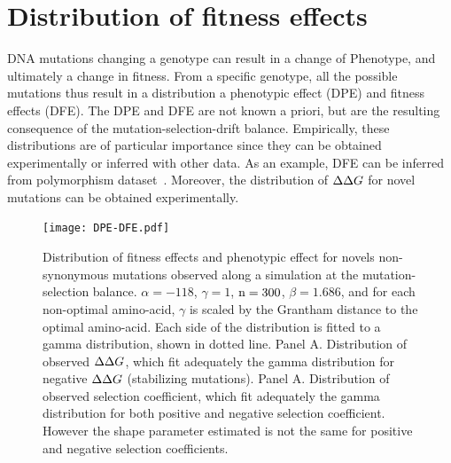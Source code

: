 \section{Distribution of fitness effects}
DNA mutations changing a genotype can result in a change of \gls{Phenotype}, and ultimately a change in fitness.
From a specific genotype, all the possible mutations thus result in a distribution a phenotypic effect (DPE) and fitness effects (\acrshort{DFE}).
The DPE and \acrshort{DFE} are not known a priori, but are the resulting consequence of the mutation-selection-drift balance.
Empirically, these distributions are of particular importance since they can be obtained experimentally or inferred with other data.
As an example, \acrshort{DFE} can be inferred from polymorphism dataset~\citep{Eyre-walker2007, Galtier2016}.
Moreover, the distribution of $\Delta \Delta G$ for novel mutations can be obtained experimentally.

\begin{figure}[H]
	\centering
	\texttt{[image: DPE-DFE.pdf]}
	\caption[Distribution of fitness effects and phenotypic effect]{
	Distribution of fitness effects and phenotypic effect for novels non-synonymous mutations observed along a simulation at the mutation-selection balance.
	$\alpha=-118$, $\gamma=1$, $\text{n}=300$, $\beta=1.686$, and for each non-optimal amino-acid, $\gamma$ is scaled by the Grantham distance to the optimal amino-acid.
	Each side of the distribution is fitted to a gamma distribution, shown in dotted line.
	Panel A. Distribution of observed $\Delta \Delta G$, which fit adequately the gamma distribution for negative $\Delta \Delta G$ (stabilizing mutations).
	Panel A. Distribution of observed selection coefficient, which fit adequately the gamma distribution for both positive and negative selection coefficient. However the shape parameter estimated is not the same for positive and negative selection coefficients.
	}
\end{figure}